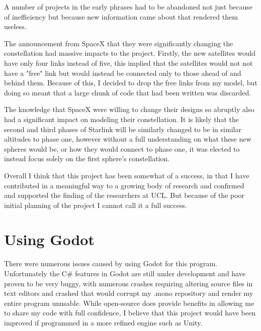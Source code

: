 \documentclass[12pt,a4paper,twoside,openright]{report}
\begin{document}
A number of projects in the early phrases had to be abandoned not just because of inefficiency but because new information came about that rendered them useless.

The announcement from SpaceX that they were significantly changing the constellation had massive impacts to the project. Firstly, the new satellites would have only four links instead of five, this implied that the satellites would not not have a "free" link but would instead be connected only to those ahead of and behind them. Because of this, I decided to drop the free links from my model, but doing so meant that a large chunk of code that had been written was discarded.

The knowledge that SpaceX were willing to change their designs so abruptly also had a significant impact on modeling their constellation. It is likely that the second and third phases of Starlink will be similarly changed to be in similar altitudes to phase one, however without a full understanding on what these new spheres would be, or how they would connect to phase one, it was elected to instead focus solely on the first sphere's constellation.

Overall I think that this project has been somewhat of a success, in that I have contributed in a meaningful way to a growing body of research and confirmed and supported the finding of the researchers at UCL. But because of the poor initial planning of the project I cannot call it a full success.

\section{Using Godot}

There were numerous issues caused by using Godot for this program. Unfortunately the C\# features in Godot are still under development and have proven to be very buggy, with numerous crashes requiring altering source files in text editors and crashed that would corrupt my .mono repository and render my entire program unusable. While open-source does provide benefits in allowing me to share my code with full confidence, I believe that this project would have been improved if programmed in a more refined engine such as Unity.

\end{document}
